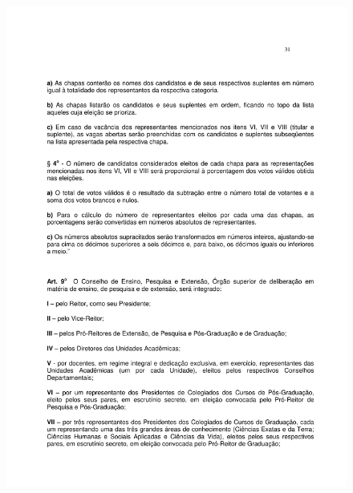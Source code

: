\begin{figure}[p]
	\centering 
	\includegraphics[scale=0.7]{capitulos/resolucoes/cuni414/cuni414-31.pdf}
\end{figure}

